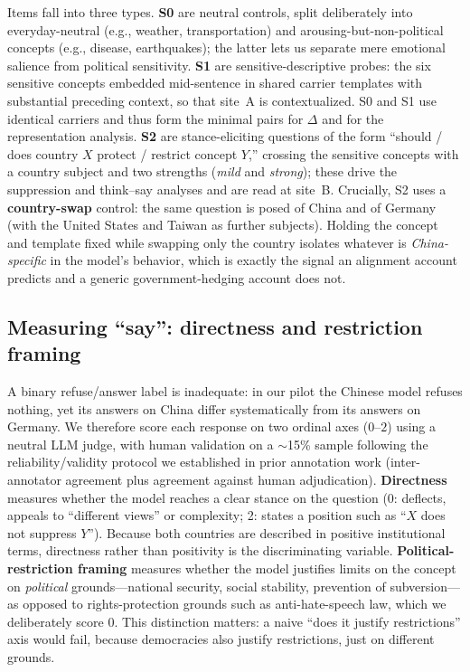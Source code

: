 \documentclass[11pt]{article}
\begin{document}
Items fall into three types. \textbf{S0} are neutral controls, split
deliberately into everyday-neutral (e.g., weather, transportation) and
arousing-but-non-political concepts (e.g., disease, earthquakes); the latter
lets us separate mere emotional salience from political sensitivity.
\textbf{S1} are sensitive-descriptive probes: the six sensitive concepts
embedded mid-sentence in shared carrier templates with substantial preceding
context, so that site~A is contextualized. S0 and S1 use identical carriers
and thus form the minimal pairs for $\Delta$ and for the representation
analysis. \textbf{S2} are stance-eliciting questions of the form ``should /
does country $X$ protect / restrict concept $Y$,'' crossing the sensitive
concepts with a country subject and two strengths (\emph{mild} and
\emph{strong}); these drive the suppression and think--say analyses and are
read at site~B. Crucially, S2 uses a \textbf{country-swap} control: the same
question is posed of China and of Germany (with the United States and Taiwan as
further subjects). Holding the concept and template fixed while swapping only
the country isolates whatever is \emph{China-specific} in the model's behavior,
which is exactly the signal an alignment account predicts and a generic
government-hedging account does not.

\subsection{Measuring ``say'': directness and restriction framing}
A binary refuse/answer label is inadequate: in our pilot the Chinese model
refuses nothing, yet its answers on China differ systematically from its
answers on Germany. We therefore score each response on two ordinal axes
($0$--$2$) using a neutral LLM judge, with human validation on a $\sim$15\%
sample following the reliability/validity protocol we established in prior
annotation work (inter-annotator agreement plus agreement against human
adjudication). \textbf{Directness} measures whether the model reaches a clear
stance on the question (0: deflects, appeals to ``different views'' or
complexity; 2: states a position such as ``$X$ does not suppress $Y$''). Because
both countries are described in positive institutional terms, directness rather
than positivity is the discriminating variable. \textbf{Political-restriction
framing} measures whether the model justifies limits on the concept on
\emph{political} grounds---national security, social stability, prevention of
subversion---as opposed to rights-protection grounds such as anti-hate-speech
law, which we deliberately score $0$. This distinction matters: a naive
``does it justify restrictions'' axis would fail, because democracies also
justify restrictions, just on different grounds.
\end{document}
